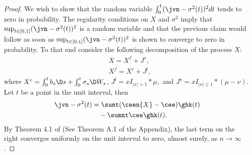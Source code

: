 \begin{proof}
  We wish to show that the random variable
  $\int_0^1 (\jvn - \sigma^2(t))^2dt$ tends to zero in probability. The regularity conditions on $X$ and $\sigma^2$ imply that  $\sup_{t \in [0,1]} (\jvn - \sigma^2(t))^2$ is a random variable and that the previous claim would follow as soon as $\sup_{t \in [0,1]} (\jvn - \sigma^2(t))^2$ is shown  to converge to  zero in probability.  To that end consider the following decomposition of the process $X$:
  \begin{align}
    &X = X^f + J^s\label{eq:xj},\\
    &X^f = X^c + J^l\label{eq:xjc},
  \end{align}
  where 
    $X^c = \int^t_0 b_s \D s + \int^t_0 \sigma_s \D W_s$, 
    $J^l = xI_{\vert x \vert > 1} \ast \mu,$
    and $J^s = xI_{\vert x \vert \le  1} \ast (\mu - \nu)$.
    Let $t$ be a point in the unit interval, then 
    \begin{align}
      \jvn -  \sigma^2(t) &= \sumt (\ceen{X} - \cee) \ghk(t)\notag \\
& \quad - \sumnt \cee \ghk(t).
      \label{eq:open}
    \end{align}
    By Theorem 4.1 of \cite{Zhang2008} (See Theorem A.1 of the Appendix), the last term on the right converges uniformly  on the unit  interval  to zero, almost surely, as $n \to \infty$. 
    

\end{proof}
